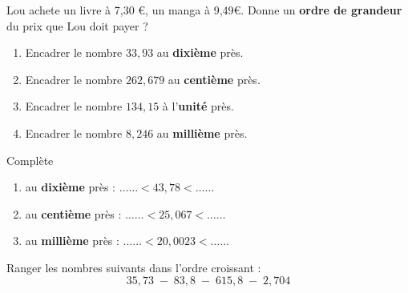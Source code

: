 \begin{pageAD} 



Lou  achete un livre à 7,30 \euro , un manga à 9,49\euro . Donne un \textbf{ordre de grandeur} du prix que Lou doit payer ?
 



\begin{enumerate}
\item Encadrer le nombre $33,93$ au \textbf{dixième} près.
 \item Encadrer le nombre $262,679$ au \textbf{centième} près.
\item Encadrer le nombre $134,15$ à l'\textbf{unité} près.
\item Encadrer le nombre $8,246$ au \textbf{millième} près.
\end{enumerate}




Complète 
\begin{enumerate}
\item au \textbf{dixième} près : $\ldots \ldots < 43,78 < \ldots \ldots $
\item au \textbf{centième} près : $\ldots \ldots < 25,067 < \ldots \ldots $
\item au \textbf{millième} près : $\ldots \ldots < 20,0023 < \ldots \ldots $
\end{enumerate}





Ranger les nombres suivants dans l'ordre croissant : \[35,73\;-\;83,8\;-\;615,8\;-\;2,704\]

\end{pageAD} 



